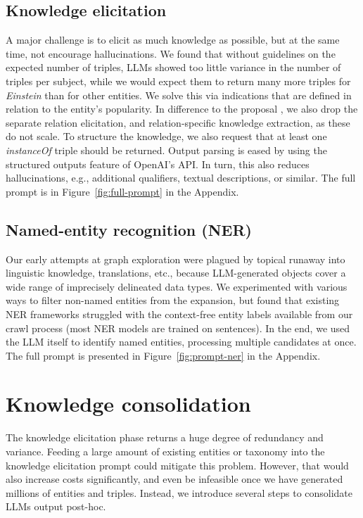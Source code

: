 \subsection{Knowledge elicitation}
A major challenge is to elicit as much knowledge as possible, but at the same time, not encourage hallucinations. We found that without guidelines on the expected number of triples, LLMs showed too little variance in the number of triples per subject, while we would expect them to return many more triples for \textit{Einstein} than for other entities. We solve this via indications that are defined in relation to the entity's popularity. In difference to the proposal \cite{cohen-etal-2023-crawling}, we also drop the separate relation elicitation, and relation-specific knowledge extraction, as these do not scale. To structure the knowledge, we also request that at least one \textit{instanceOf} triple should be returned. Output parsing is eased by using the structured outputs feature of OpenAI's API. In turn, this also reduces hallucinations, e.g., additional qualifiers, textual descriptions, or similar. The full prompt is in Figure~\ref{fig:full-prompt} in the Appendix.




\subsection{Named-entity recognition (NER)}
Our early attempts at graph exploration were plagued by topical runaway into linguistic knowledge, translations, etc., because LLM-generated objects cover a wide range of imprecisely delineated data types. We experimented with various ways to filter non-named entities from the expansion, but found that existing NER frameworks struggled with the context-free entity labels available from our crawl process (most NER models are trained on sentences). In the end, we used the LLM itself to identify named entities, processing multiple candidates at once. The full prompt is presented in Figure~\ref{fig:prompt-ner} in the Appendix.



\section{Knowledge consolidation}

The knowledge elicitation phase 
returns
a huge degree of redundancy and variance.
Feeding a large amount of existing entities or taxonomy into the knowledge elicitation prompt could mitigate this problem.
However, that would also increase costs significantly, and even be infeasible once we have generated millions of entities and triples.
Instead, we introduce several steps to consolidate LLMs output post-hoc.



